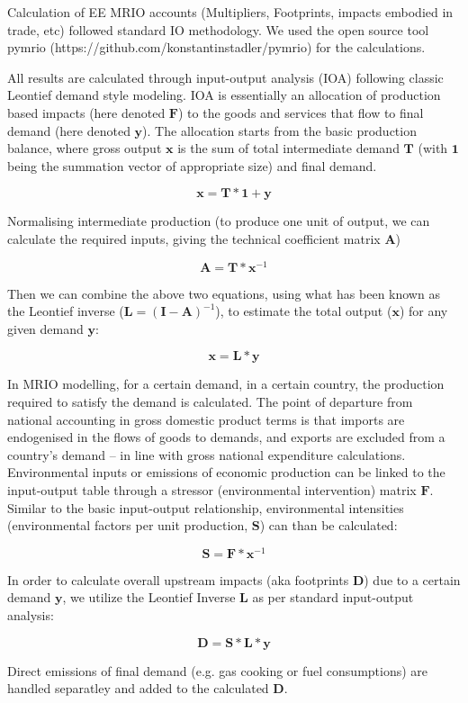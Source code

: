 Calculation of EE MRIO accounts (Multipliers, Footprints, impacts embodied in trade, etc) followed
standard IO methodology. We used the open source tool pymrio (https://github.com/konstantinstadler/pymrio) for the calculations.

All results are  calculated through input-output analysis (IOA) following classic Leontief demand style modeling. IOA is essentially an allocation of production based impacts (here denoted $\textbf{F}$) to the goods and services that flow to final demand (here denoted $\textbf{y}$). The allocation starts from the basic production balance, where gross output $\textbf{x}$ is the sum of total intermediate demand $\textbf{T}$ (with $\textbf{1}$ being the summation vector of appropriate size) and final demand. 

\begin{equation}
\textbf{x}=\textbf{T}*\textbf{1}+\textbf{y}
\end{equation}

Normalising intermediate production (to produce one unit of output, we can calculate the required inputs, giving the technical coefficient matrix $\textbf{A}$)

\begin{equation}
\textbf{A}=\textbf{T} * \textbf{x}^{-1}
\end{equation}

Then we can combine the above two equations, using what has been known as the Leontief inverse ($\textbf{L} = (\textbf{I}-\textbf{A})^{-1}$), to estimate the total output ($\textbf{x}$) for any given demand $\textbf{y}$:

\begin{equation}
\textbf{x}=\textbf{L} * \textbf{y}
\end{equation}

In MRIO modelling, for a certain demand, in a certain country, the production required to satisfy the demand is calculated. The point of departure from national accounting in gross domestic product terms is that imports are endogenised in the flows of goods to demands, and exports are excluded from a country’s demand – in line with gross national expenditure calculations. Environmental inputs or emissions of economic production can be linked to the input-output table through a stressor (environmental intervention) matrix $\textbf{F}$. Similar to the basic input-output relationship, environmental intensities (environmental factors per unit production, $\textbf{S}$) can than be calculated:

\begin{equation}
\textbf{S} = \textbf{F} * \textbf{x}^{-1}
\end{equation}

In order to calculate overall upstream impacts (aka footprints $\textbf{D}$) due to a certain demand $\textbf{y}$, we utilize the Leontief Inverse $\textbf{L}$ as per standard input-output analysis:

\begin{equation}
\textbf{D} = \textbf{S} * \textbf{L} * \textbf{y}
\end{equation}

Direct emissions of final demand (e.g. gas cooking or fuel consumptions) are handled separatley and added to the calculated $\textbf{D}$.
